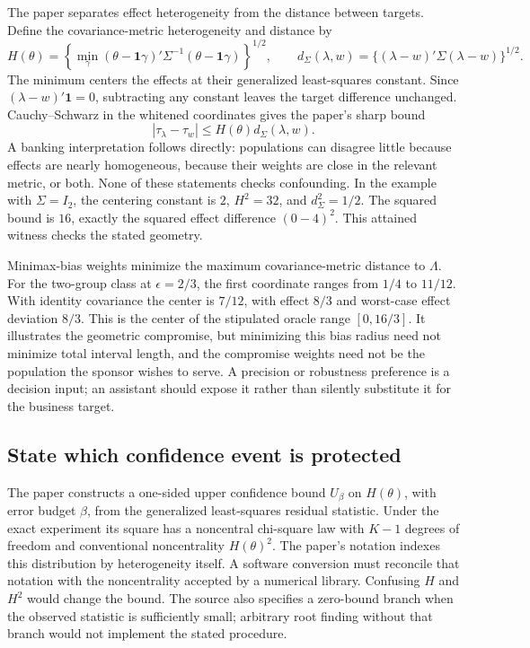 The paper separates effect heterogeneity from the distance between targets.
Define the covariance-metric heterogeneity and distance by
\begin{equation}
 H(\theta)=\left\{\min_\gamma
  (\theta-\mathbf{1}\gamma)'\Sigma^{-1}
  (\theta-\mathbf{1}\gamma)\right\}^{1/2},\qquad
 d_\Sigma(\lambda,w)=\{(\lambda-w)'\Sigma(\lambda-w)\}^{1/2}.
 \label{exec22:targets-geometry}
\end{equation}
The minimum centers the effects at their generalized least-squares constant.
Since $(\lambda-w)'\mathbf{1}=0$, subtracting any constant leaves the target
difference unchanged. Cauchy--Schwarz in the whitened coordinates gives the
paper's sharp bound
\begin{equation}
 |\tau_\lambda-\tau_w|
 \leq H(\theta)d_\Sigma(\lambda,w).
 \label{exec22:targets-bound}
\end{equation}
A banking interpretation follows directly: populations can disagree little
because effects are nearly homogeneous, because their weights are close in the
relevant metric, or both. None of these statements checks confounding.
In the example with $\Sigma=I_2$, the centering constant is $2$,
$H^2=32$, and $d_\Sigma^2=1/2$. The squared bound is $16$, exactly the squared
effect difference $(0-4)^2$. This attained witness checks the stated geometry.

Minimax-bias weights minimize the maximum covariance-metric distance to
$\Lambda$. For the two-group class at $\epsilon=2/3$, the first coordinate
ranges from $1/4$ to $11/12$. With identity covariance the center is
$7/12$, with effect $8/3$ and worst-case effect deviation $8/3$. This is the
center of the stipulated oracle range $[0,16/3]$. It illustrates the geometric
compromise, but minimizing this bias radius need not minimize total interval
length, and the compromise weights need not be the population the sponsor
wishes to serve. A precision or robustness preference is a decision input;
an assistant should expose it rather than silently substitute it for the
business target.

\subsection{State which confidence event is protected}

The paper constructs a one-sided upper confidence bound $U_\beta$ on
$H(\theta)$, with error budget $\beta$, from the generalized least-squares
residual statistic. Under the exact experiment its square has a noncentral
chi-square law with $K-1$ degrees of freedom and conventional noncentrality
$H(\theta)^2$. The paper's notation indexes this distribution by
heterogeneity itself. A software conversion must reconcile that notation with
the noncentrality accepted by a numerical library. Confusing $H$ and $H^2$
would change the bound. The source also specifies a zero-bound branch when
the observed statistic is sufficiently small; arbitrary root finding without
that branch would not implement the stated procedure.

